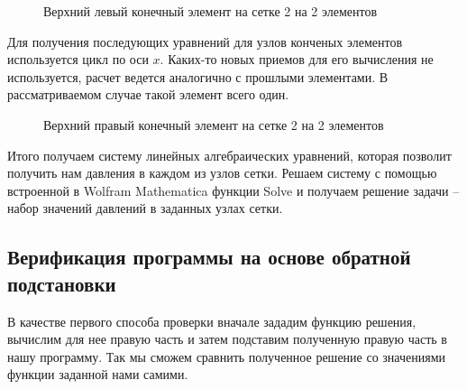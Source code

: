 \documentclass[a4paper,14pt]{extarticle}
\begin{document}
\begin{figure}[!htbp]
	\caption{Верхний левый конечный элемент на сетке 2 на 2 элементов}
	\label{left-top-el}
\end{figure}
\newpage
Для получения последующих уравнений для узлов конченых элементов используется цикл по оси $x$. Каких-то новых приемов для его вычисления не используется, расчет ведется аналогично с прошлыми элементами. В рассматриваемом случае такой элемент всего один.
\begin{figure}[!htbp]
	\caption{Верхний правый конечный элемент на сетке 2 на 2 элементов}
	\label{right-top-el}
\end{figure}

Итого получаем систему линейных алгебраических уравнений, которая позволит получить нам давления в каждом из узлов сетки. Решаем систему с помощью встроенной в Wolfram Mathematica функции Solve и получаем решение задачи -- набор значений давлений в заданных узлах сетки.

\subsection{Верификация программы на основе обратной подстановки}
В качестве первого способа проверки вначале зададим функцию решения, вычислим для нее правую часть и затем подставим полученную правую часть в нашу программу. Так мы сможем сравнить полученное решение со значениями функции заданной нами самими.
\end{document}
